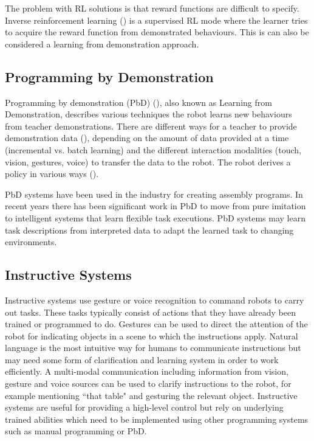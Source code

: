 The problem with RL solutions is that reward functions are difficult to specify.
Inverse reinforcement learning (\cite{abbeel2011inverse}) is a supervised RL mode where the learner tries to acquire the reward function from demonstrated behaviours.
This is can also be considered a learning from demonstration approach.

\subsection{Programming by Demonstration}
Programming by demonstration (PbD) (\cite{billard2008robot}), also known as Learning from Demonstration, describes various techniques the robot learns new behaviours from teacher demonstrations. 
There are different ways for a teacher to provide demonstration data (), depending on the amount of data provided at a time (incremental vs. batch learning) and the different interaction modalities (touch, vision, gestures, voice) to transfer the data to the robot. 
The robot derives a policy in various ways (). 

PbD systems have been used in the industry for creating assembly programs. 
In recent years there has been significant work in PbD to move from pure imitation to intelligent systems that learn flexible task executions. 
PbD systems may learn task descriptions from interpreted data to adapt the learned task to changing environments.

\subsection{Instructive Systems}
Instructive systems use gesture or voice recognition to command robots to carry out tasks.
These tasks typically consist of actions that they have already been trained or programmed to do. 
Gestures can be used to direct the attention of the robot for indicating objects in a scene to which the instructions apply. 
Natural language is the most intuitive way for humans to communicate instructions but may need some form of clarification and learning system in order to work efficiently. 
A multi-modal communication including information from vision, gesture and voice sources can be used to clarify instructions to the robot, for example mentioning ``that table" and gesturing the relevant object.
Instructive systems are useful for providing a high-level control but rely on underlying trained abilities which need to be implemented using other programming systems such as manual programming or PbD.


